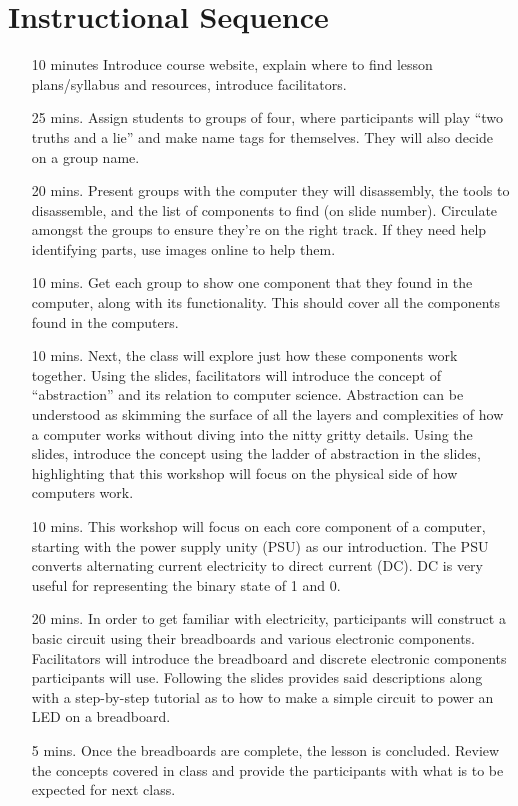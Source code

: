 \documentclass[11pt]{article}
\begin{document}
  \section*{Instructional Sequence}
  \begin{itemize}
    \item[10 minutes] Introduce course website, explain where to find lesson
      plans/syllabus and resources, introduce facilitators.
    \item[25 mins.] Assign students to groups of four, where participants will
      play ``two truths and a lie'' and make name tags for themselves. They will
      also decide on a group name.
    \item[20 mins.] Present groups with the computer they will disassembly,
      the tools to disassemble, and the list of components to find (on slide number).
      Circulate amongst the groups to ensure they're on the right track. If
      they need help identifying parts, use images online to help them.
    \item[10 mins.] Get each group to show one component that they found in the
      computer, along with its functionality. This should cover all the
      components found in the computers.
    \item[10 mins.] Next, the class will explore just how these components work
      together. Using the slides, facilitators will introduce the concept of
      ``abstraction'' and its relation to computer science. Abstraction can be
      understood as skimming the surface of all the layers and complexities of
      how a computer works without diving into the nitty gritty details. Using
      the slides, introduce the concept using the ladder of abstraction in the
      slides, highlighting that this workshop will
      focus on the physical side of how computers work.
    \item[10 mins.] This workshop will focus on each core component of a
      computer, starting with the power supply unity (PSU) as our
      introduction. The PSU converts alternating current electricity to direct
      current (DC). DC is very useful for representing the binary state of 1 and
      0.
    \item[20 mins.] In order to get familiar with electricity, participants will
      construct a basic circuit using their breadboards and various electronic
      components. Facilitators will introduce the breadboard and discrete
      electronic components participants will use. Following the slides provides
      said descriptions along with a step-by-step tutorial as to how to make a
      simple circuit to power an LED on a breadboard.
    \item[5 mins.] Once the breadboards are complete, the lesson is
      concluded. Review the concepts covered in class and provide the
      participants with what is to be expected for next class.
  \end{itemize}
\end{document}
